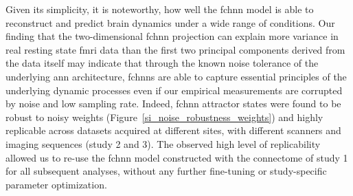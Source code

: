 \documentclass{article}
\begin{document}
Given its simplicity, it is noteworthy, how well the \acrshort{fchnn} model is able to reconstruct and predict brain dynamics under a wide range of conditions.
Our finding that the two-dimensional \acrshort{fchnn} projection can explain more variance in real resting state \acrshort{fmri} data than the first two principal components derived from the data itself may indicate that through the known noise tolerance of the underlying \acrshort{ann} architecture, \acrshort{fchnn}s are able to capture essential principles of the underlying dynamic processes even if our empirical measurements are corrupted by noise and low sampling rate.
Indeed, \acrshort{fchnn} attractor states were found to be robust to noisy weights (Figure~\ref{si_noise_robustness_weights}) and highly replicable across datasets acquired at different sites, with different scanners and imaging sequences (study 2 and 3). The observed high level of replicability allowed us to re-use the \acrshort{fchnn} model constructed with the connectome of study 1 for all subsequent analyses, without any further fine-tuning or study-specific parameter optimization.
\end{document}
